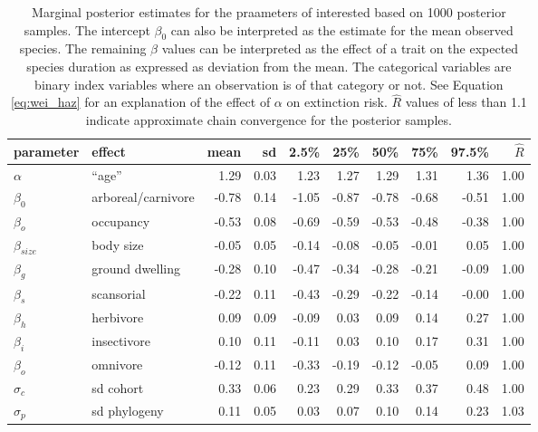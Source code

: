 \begin{table}[c]
  \centering
  \caption[Posterior estimates of covariates on mammal survival]{Marginal posterior estimates for the praameters of interested based on 1000 posterior samples. The intercept \(\beta_{0}\) can also be interpreted as the estimate for the mean observed species. The remaining \(\beta\) values can be interpreted as the effect of a trait on the expected species duration as expressed as deviation from the mean. The categorical variables are binary index variables where an observation is of that category or not. See Equation \ref{eq:wei_haz} for an explanation of the effect of \(\alpha\) on extinction risk. \(\hat{R}\) values of less than 1.1 indicate approximate chain convergence for the posterior samples.}
  \begin{tabular}{ l l r r r r r r r r }
    parameter & effect & mean & sd & 2.5\% & 25\% & 50\% & 75\% & 97.5\% & \(\hat{R}\) \\ 
    \hline
    \(\alpha\) & ``age'' & 1.29 & 0.03 & 1.23 & 1.27 & 1.29 & 1.31 & 1.36 & 1.00 \\ 
    \hline
    \(\beta_{0}\) & arboreal/carnivore & -0.78 & 0.14 & -1.05 & -0.87 & -0.78 & -0.68 & -0.51 & 1.00 \\ 
    \(\beta_{o}\) & occupancy & -0.53 & 0.08 & -0.69 & -0.59 & -0.53 & -0.48 & -0.38 & 1.00 \\ 
    \(\beta_{size}\) & body size & -0.05 & 0.05 & -0.14 & -0.08 & -0.05 & -0.01 & 0.05 & 1.00 \\ 
    \(\beta_{g}\) & ground dwelling & -0.28 & 0.10 & -0.47 & -0.34 & -0.28 & -0.21 & -0.09 & 1.00 \\ 
    \(\beta_{s}\) & scansorial & -0.22 & 0.11 & -0.43 & -0.29 & -0.22 & -0.14 & -0.00 & 1.00 \\ 
    \(\beta_{h}\) & herbivore & 0.09 & 0.09 & -0.09 & 0.03 & 0.09 & 0.14 & 0.27 & 1.00 \\ 
    \(\beta_{i}\) & insectivore & 0.10 & 0.11 & -0.11 & 0.03 & 0.10 & 0.17 & 0.31 & 1.00 \\ 
    \(\beta_{o}\) & omnivore & -0.12 & 0.11 & -0.33 & -0.19 & -0.12 & -0.05 & 0.09 & 1.00 \\ 
    \hline
    \(\sigma_{c}\) & sd cohort & 0.33 & 0.06 & 0.23 & 0.29 & 0.33 & 0.37 & 0.48 & 1.00 \\ 
    \(\sigma_{p}\) & sd phylogeny & 0.11 & 0.05 & 0.03 & 0.07 & 0.10 & 0.14 & 0.23 & 1.03 \\ 
    \hline
  \end{tabular}
  \label{tab:post_sum}
\end{table}






